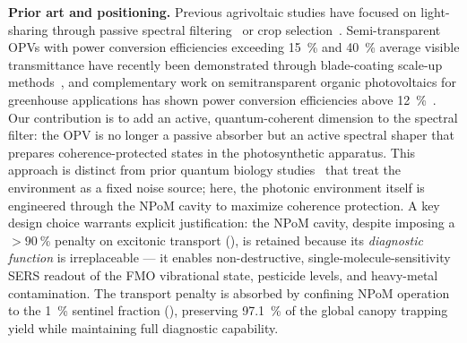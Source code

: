 \documentclass[onecolumn,a4paper,12pt]{article}
\begin{document}
\textbf{Prior art and positioning.} Previous agrivoltaic studies have focused on light-sharing through passive spectral filtering~\cite{Thompson2020} or crop selection~\cite{Dupraz2011}.
Semi-transparent OPVs with power conversion efficiencies exceeding \qty{15}{\percent} and \qty{40}{\percent} average visible transmittance have recently been demonstrated through blade-coating scale-up methods~\cite{Ravishankar2024}, and complementary work on semitransparent organic photovoltaics for greenhouse applications has shown power conversion efficiencies above \qty{12}{\percent}~\cite{Alshareef2024}.
Our contribution is to add an active, quantum-coherent dimension to the spectral filter: the OPV is no longer a passive absorber but an active spectral shaper that prepares coherence-protected states in the photosynthetic apparatus.
This approach is distinct from prior quantum biology studies~\cite{Scholes2015} that treat the environment as a fixed noise source; here, the photonic environment itself is engineered through the NPoM cavity to maximize coherence protection.
A key design choice warrants explicit justification: the NPoM cavity, despite imposing a $>\qty{90}{\percent}$ penalty on excitonic transport (), is retained because its \emph{diagnostic function} is irreplaceable --- it enables non-destructive, single-molecule-sensitivity SERS readout of the FMO vibrational state, pesticide levels, and heavy-metal contamination. The transport penalty is absorbed by confining NPoM operation to the \qty{1}{\percent} sentinel fraction (), preserving \qty{97.1}{\percent} of the global canopy trapping yield while maintaining full diagnostic capability.
\end{document}
